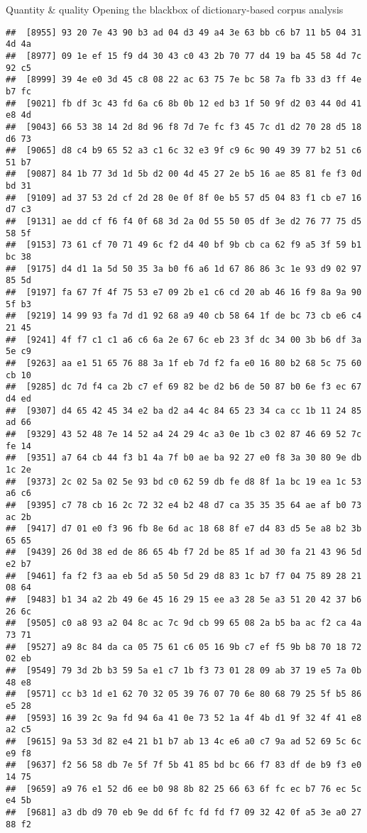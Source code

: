 \documentclass[
  ignorenonframetext,
]{beamer}
\begin{document}
\begin{frame}[fragile]{Quantity \& quality \textbar{} Opening the
blackbox of dictionary-based corpus analysis}
\begin{verbatim}
##  [8955] 93 20 7e 43 90 b3 ad 04 d3 49 a4 3e 63 bb c6 b7 11 b5 04 31 4d 4a
##  [8977] 09 1e ef 15 f9 d4 30 43 c0 43 2b 70 77 d4 19 ba 45 58 4d 7c 92 c5
##  [8999] 39 4e e0 3d 45 c8 08 22 ac 63 75 7e bc 58 7a fb 33 d3 ff 4e b7 fc
##  [9021] fb df 3c 43 fd 6a c6 8b 0b 12 ed b3 1f 50 9f d2 03 44 0d 41 e8 4d
##  [9043] 66 53 38 14 2d 8d 96 f8 7d 7e fc f3 45 7c d1 d2 70 28 d5 18 d6 73
##  [9065] d8 c4 b9 65 52 a3 c1 6c 32 e3 9f c9 6c 90 49 39 77 b2 51 c6 51 b7
##  [9087] 84 1b 77 3d 1d 5b d2 00 4d 45 27 2e b5 16 ae 85 81 fe f3 0d bd 31
##  [9109] ad 37 53 2d cf 2d 28 0e 0f 8f 0e b5 57 d5 04 83 f1 cb e7 16 d7 c3
##  [9131] ae dd cf f6 f4 0f 68 3d 2a 0d 55 50 05 df 3e d2 76 77 75 d5 58 5f
##  [9153] 73 61 cf 70 71 49 6c f2 d4 40 bf 9b cb ca 62 f9 a5 3f 59 b1 bc 38
##  [9175] d4 d1 1a 5d 50 35 3a b0 f6 a6 1d 67 86 86 3c 1e 93 d9 02 97 85 5d
##  [9197] fa 67 7f 4f 75 53 e7 09 2b e1 c6 cd 20 ab 46 16 f9 8a 9a 90 5f b3
##  [9219] 14 99 93 fa 7d d1 92 68 a9 40 cb 58 64 1f de bc 73 cb e6 c4 21 45
##  [9241] 4f f7 c1 c1 a6 c6 6a 2e 67 6c eb 23 3f dc 34 00 3b b6 df 3a 5e c9
##  [9263] aa e1 51 65 76 88 3a 1f eb 7d f2 fa e0 16 80 b2 68 5c 75 60 cb 10
##  [9285] dc 7d f4 ca 2b c7 ef 69 82 be d2 b6 de 50 87 b0 6e f3 ec 67 d4 ed
##  [9307] d4 65 42 45 34 e2 ba d2 a4 4c 84 65 23 34 ca cc 1b 11 24 85 ad 66
##  [9329] 43 52 48 7e 14 52 a4 24 29 4c a3 0e 1b c3 02 87 46 69 52 7c fe 14
##  [9351] a7 64 cb 44 f3 b1 4a 7f b0 ae ba 92 27 e0 f8 3a 30 80 9e db 1c 2e
##  [9373] 2c 02 5a 02 5e 93 bd c0 62 59 db fe d8 8f 1a bc 19 ea 1c 53 a6 c6
##  [9395] c7 78 cb 16 2c 72 32 e4 b2 48 d7 ca 35 35 35 64 ae af b0 73 ac 2b
##  [9417] d7 01 e0 f3 96 fb 8e 6d ac 18 68 8f e7 d4 83 d5 5e a8 b2 3b 65 65
##  [9439] 26 0d 38 ed de 86 65 4b f7 2d be 85 1f ad 30 fa 21 43 96 5d e2 b7
##  [9461] fa f2 f3 aa eb 5d a5 50 5d 29 d8 83 1c b7 f7 04 75 89 28 21 08 64
##  [9483] b1 34 a2 2b 49 6e 45 16 29 15 ee a3 28 5e a3 51 20 42 37 b6 26 6c
##  [9505] c0 a8 93 a2 04 8c ac 7c 9d cb 99 65 08 2a b5 ba ac f2 ca 4a 73 71
##  [9527] a9 8c 84 da ca 05 75 61 c6 05 16 9b c7 ef f5 9b b8 70 18 72 02 eb
##  [9549] 79 3d 2b b3 59 5a e1 c7 1b f3 73 01 28 09 ab 37 19 e5 7a 0b 48 e8
##  [9571] cc b3 1d e1 62 70 32 05 39 76 07 70 6e 80 68 79 25 5f b5 86 e5 28
##  [9593] 16 39 2c 9a fd 94 6a 41 0e 73 52 1a 4f 4b d1 9f 32 4f 41 e8 a2 c5
##  [9615] 9a 53 3d 82 e4 21 b1 b7 ab 13 4c e6 a0 c7 9a ad 52 69 5c 6c e9 f8
##  [9637] f2 56 58 db 7e 5f 7f 5b 41 85 bd bc 66 f7 83 df de b9 f3 e0 14 75
##  [9659] a9 76 e1 52 d6 ee b0 98 8b 82 25 66 63 6f fc ec b7 76 ec 5c e4 5b
##  [9681] a3 db d9 70 eb 9e dd 6f fc fd fd f7 09 32 42 0f a5 3e a0 27 88 f2

\end{verbatim}
\end{frame}
\end{document}

